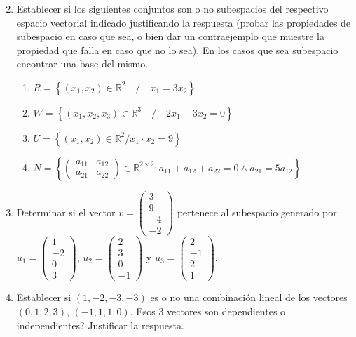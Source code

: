 \documentclass[12pt]{article}
\begin{document}
\begin{enumerate}
\begin{multicols}{2}
  \end{multicols}
  \item Establecer si los siguientes conjuntos son o no subespacios del respectivo espacio vectorial indicado justificando la respuesta (probar las propiedades de subespacio en caso que sea, o bien dar un contraejemplo que muestre la propiedad que falla en caso que no lo sea). En los casos que sea subespacio encontrar una base del mismo.
    \begin{enumerate}
      \item $R = \left\{(x_1,x_2) \in \mathbb{R}^2\quad /\quad x_1 = 3x_2\right\}$
      \item $W = \left\{(x_1,x_2,x_3) \in \mathbb{R}^3\quad /\quad 2x_1 - 3x_2 = 0\right\}$
      \item $U = \left\{(x_1,x_2) \in \mathbb{R}^2 / x_1\cdot x_2 = 9\right\}$
      \item $N=\left\{\begin{pmatrix}
      a_{11} & a_{12}\\
      a_{21} & a_{22}
    \end{pmatrix} \in \mathbb{R}^{2\times2}:a_{11}+a_{12}+a_{22}=0 \wedge a_{21}=5a_{12}\right\}$
    \end{enumerate}            
  \item Determinar si el vector $v=\begin{pmatrix}
  3\\
  9\\
  -4\\
  -2
  \end{pmatrix}$ pertenece al subespacio generado por $u_1=\begin{pmatrix}
  1\\
  -2\\
  0\\
  3\end{pmatrix}$, $u_2 = \begin{pmatrix}
    2\\
    3\\
    0\\
    -1
  \end{pmatrix}$ y $u_3 = \begin{pmatrix}
    2\\
    -1\\
    2\\
    1
  \end{pmatrix}$.
  \item Establecer si $(1,-2,-3,-3)$ es o no una combinación lineal de los vectores $(0, 1, 2, 3)$, $(-1, 1, 1, 0)$. Esos 3 vectores son dependientes o independientes? Justificar la respuesta.

\end{enumerate}
\end{document}
